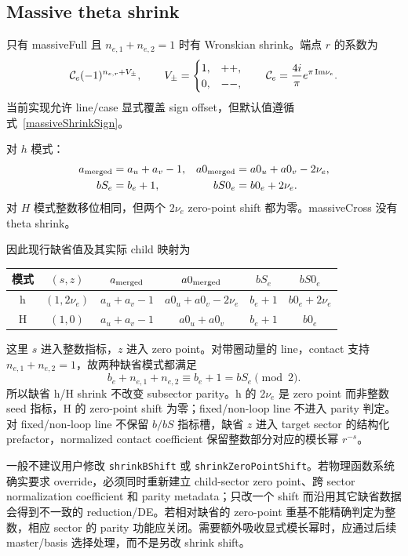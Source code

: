 ﻿\documentclass[a4paper,11pt]{article}
\begin{document}
\subsection{Massive theta shrink}

只有 massiveFull 且 $n_{e,1}+n_{e,2}=1$ 时有 Wronskian shrink。端点 $r$ 的系数为
\begin{equation}
 {\cal C}_e(-1)^{n_{e,r}+V_{\pm}},
 \qquad
 V_{\pm}=
 \begin{cases}
 1,&++,\\
 0,&--,
 \end{cases}
 \qquad
 {\cal C}_e=\frac{4i}{\pi}e^{\pi\,\mathrm{Im}\nu_e}.
 \label{massiveShrinkSign}
\end{equation}
当前实现允许 line/case 显式覆盖 sign offset，但默认值遵循式~\eqref{massiveShrinkSign}。

对 $h$ 模式：
\begin{align}
 a_{\rm merged}&=a_u+a_v-1,&
 a0_{\rm merged}&=a0_u+a0_v-2\nu_e,\\
 bS_e&=b_e+1,&
 bS0_e&=b0_e+2\nu_e.
\end{align}
对 $H$ 模式整数移位相同，但两个 $2\nu_e$ zero-point shift 都为零。massiveCross 没有 theta shrink。

因此现行缺省值及其实际 child 映射为
\begin{center}
\begin{tabular}{c|c|c|c|c|c}
\toprule
模式 & $(s,z)$ & $a_{\rm merged}$ & $a0_{\rm merged}$ & $bS_e$ & $bS0_e$\\
\midrule
h & $(1,2\nu_e)$ & $a_u+a_v-1$ & $a0_u+a0_v-2\nu_e$ & $b_e+1$ & $b0_e+2\nu_e$\\
H & $(1,0)$ & $a_u+a_v-1$ & $a0_u+a0_v$ & $b_e+1$ & $b0_e$\\
\bottomrule
\end{tabular}
\end{center}
这里 $s$ 进入整数指标，$z$ 进入 zero point。对带圈动量的 line，contact 支持 $n_{e,1}+n_{e,2}=1$，故两种缺省模式都满足
\begin{equation}
 b_e+n_{e,1}+n_{e,2}\equiv b_e+1=bS_e\pmod 2.
\end{equation}
所以缺省 h/H shrink 不改变 subsector parity。h 的 $2\nu_e$ 是 zero point 而非整数 seed 指标，H 的 zero-point shift 为零；fixed/non-loop line 不进入 parity 判定。对 fixed/non-loop line 不保留 $b/bS$ 指标槽，缺省 $z$ 进入 target sector 的结构化 prefactor，normalized contact coefficient 保留整数部分对应的模长幂 $r^{-s}$。

一般不建议用户修改 \texttt{shrinkBShift} 或 \texttt{shrinkZeroPointShift}。若物理函数系统确实要求 override，必须同时重新建立 child-sector zero point、跨 sector normalization coefficient 和 parity metadata；只改一个 shift 而沿用其它缺省数据会得到不一致的 reduction/DE。若相对缺省的 zero-point 重基不能精确判定为整数，相应 sector 的 parity 功能应关闭。需要额外吸收显式模长幂时，应通过后续 master/basis 选择处理，而不是另改 shrink shift。
\end{document}
